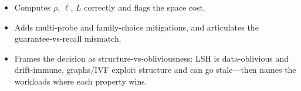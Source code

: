 \begin{interviewq}

\goodgreat
\begin{itemize}
    \item {} Computes $\rho$, $\ell$, $L$ correctly and flags the space cost.
    \item {} Adds multi-probe and family-choice mitigations, and articulates the guarantee-vs-recall mismatch.
    \item {} Frames the decision as structure-vs-obliviousness: LSH is data-oblivious and drift-immune, graphs/IVF exploit structure and can go stale---then names the workloads where each property wins.
\end{itemize}

\end{interviewq}


